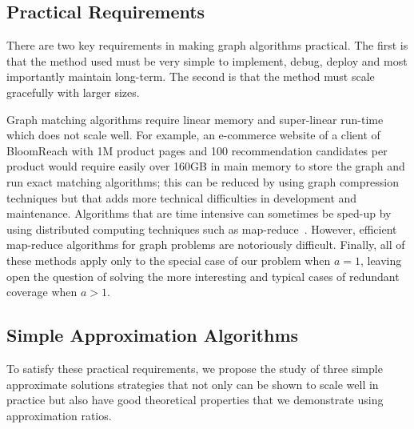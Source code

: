 
\subsection{Practical Requirements}

There are two key requirements in making graph algorithms
practical. The first is that the method used must be very simple to
implement, debug, deploy and most importantly maintain long-term. The second is that the method must scale
gracefully with larger sizes. \vs

Graph matching algorithms require linear memory and super-linear run-time
which does not scale well. For example, an e-commerce website of a
client of BloomReach with 1M product pages and 100 recommendation
candidates per product would require easily over 160GB in main memory to store the graph
and run exact matching algorithms; this can be reduced by using graph
compression techniques but that adds more technical difficulties in
development and maintenance. Algorithms that are time intensive
can sometimes be sped-up by using distributed computing techniques such as
map-reduce~\cite{DeanGhemawat2004}. However, efficient map-reduce
algorithms for graph problems are notoriously difficult. Finally, all of these methods apply only to the special case of our problem when $a=1$, leaving open the question of solving the more interesting and typical cases of redundant coverage when $a > 1$.\vs

\subsection{Simple Approximation Algorithms}

To satisfy these practical requirements,
we propose
the study of three simple approximate solutions strategies that not only can be shown to scale well in practice but also have good theoretical
properties that we demonstrate using approximation ratios.

